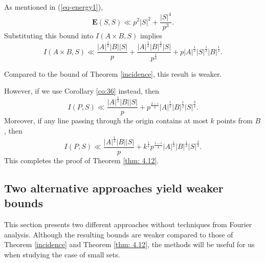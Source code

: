 \documentclass[11pt]{article}
\def\Ebf{\textbf{E}}
\def\l({\left(}
\def\r){\right)}
\begin{document}
As mentioned in (\ref{eq-energy1}), 
 \[ \Ebf \l( S, S \r) \ll p^2 |S|^2 + \frac{|S|^4}{p^3} .\]
Substituting this bound into $I(A\times B, S)$ implies 
 \[ I(A\times B ,S)\ll \frac{|A|^{\frac{1}{2}}|B||S|}{p}+\frac{|A|^{\frac{1}{2}}|B|^{\frac{1}{2}}|S|}{p^{\frac{1}{4}}}+p|A|^{\frac{1}{2}}|S|^{\frac{1}{2}}|B|^{\frac{1}{2}}.\]

Compared to the bound of Theorem \ref{incidence}, this result is weaker. 

However, if we use Corollary \ref{co:36} instead, then
    \[ I(P,S) \ll \frac{|A|^{\frac{1}{2}}|B||S|}{p} + p^{\frac{2-\epsilon}{4}}|A|^{\frac{1}{2}}|B|^{\frac{1}{2}}|S|^{\frac{3}{4}}.\]
Moreover,  if any line passing through the origin contains at most $k$ points from $B$, then
    \[ I(P,S) \ll \frac{|A|^{\frac{1}{2}}|B||S|}{p} + k^{\frac{1}{4}}p^{\frac{1-\epsilon}{4}}|A|^{\frac{1}{2}}|B|^{\frac{1}{2}}|S|^{\frac{3}{4}}.\]
This completes the proof of Theorem \ref{thm: 4.12}.



\subsection{Two alternative approaches yield weaker bounds}
This section presents two different approaches without techniques from Fourier analysis. Although the resulting bounds are weaker compared to those of Theorem \ref{incidence} and Theorem \ref{thm: 4.12}, the methods will be useful for us when studying the case of small sets. 
\end{document}
